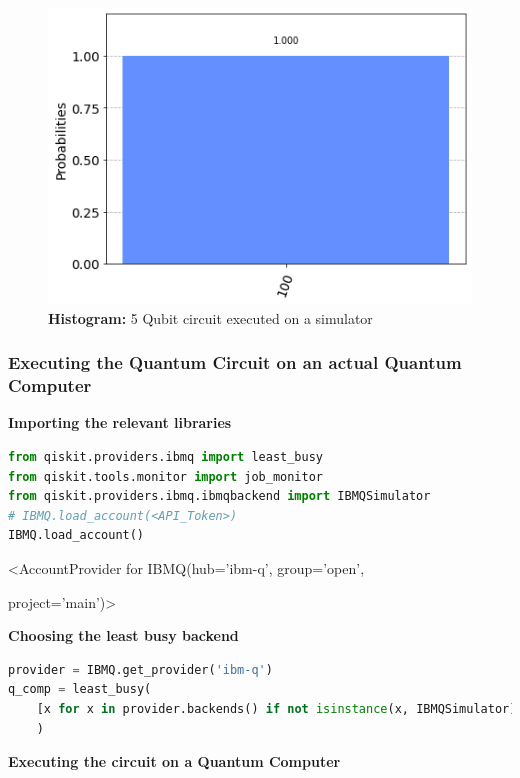 \begin{figure}[h]%
	\centering
	\includegraphics[width=0.9\linewidth]{./images/5qubit_sim.png}
	\caption{\textbf{Histogram:} 5 Qubit circuit executed on a simulator}%
	\label{fig:5qubit_sim}%
\end{figure}


\subsubsection{Executing the Quantum Circuit on an actual Quantum Computer}
\label{code:executing_the_quantum_circuit_on_a_quantum_computer}
\textbf{Importing the relevant libraries}
\label{code:importing_the_libraries_2}
\begin{lstlisting}[language=Python]
from qiskit.providers.ibmq import least_busy
from qiskit.tools.monitor import job_monitor
from qiskit.providers.ibmq.ibmqbackend import IBMQSimulator
# IBMQ.load_account(<API_Token>)
IBMQ.load_account()\end{lstlisting}
{\selectfont <AccountProvider for IBMQ(hub='ibm-q', group='open',\par
project='main')>}
\vspace{3mm}

\textbf{Choosing the least busy backend}

\begin{lstlisting}[language=Python]
provider = IBMQ.get_provider('ibm-q')
q_comp = least_busy(
	[x for x in provider.backends() if not isinstance(x, IBMQSimulator)]
	)\end{lstlisting}
\vspace{3mm}

\textbf{Executing the circuit on a Quantum Computer}

